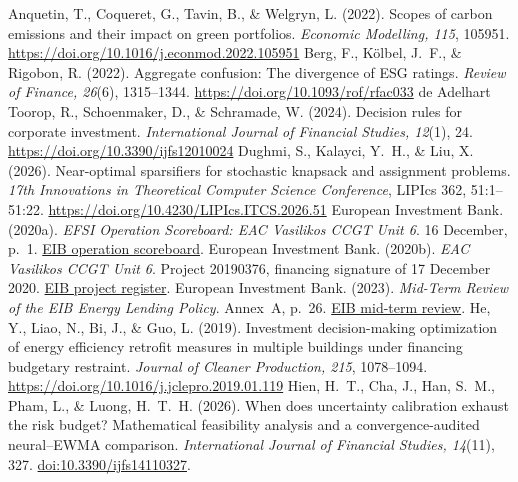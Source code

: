 \begin{thebibliography}{}
\setlength{\itemsep}{5pt plus 1pt}
 Anquetin, T., Coqueret, G., Tavin, B., \& Welgryn, L. (2022). Scopes of carbon emissions and their impact on green portfolios. \emph{Economic Modelling, 115}, 105951. \url{https://doi.org/10.1016/j.econmod.2022.105951}
 Berg, F., Kölbel, J.~F., \& Rigobon, R. (2022). Aggregate confusion: The divergence of ESG ratings. \emph{Review of Finance, 26}(6), 1315--1344. \url{https://doi.org/10.1093/rof/rfac033}
 de Adelhart Toorop, R., Schoenmaker, D., \& Schramade, W. (2024). Decision rules for corporate investment. \emph{International Journal of Financial Studies, 12}(1), 24. \url{https://doi.org/10.3390/ijfs12010024}
 Dughmi, S., Kalayci, Y.~H., \& Liu, X. (2026). Near-optimal sparsifiers for stochastic knapsack and assignment problems. \emph{17th Innovations in Theoretical Computer Science Conference}, LIPIcs 362, 51:1--51:22. \url{https://doi.org/10.4230/LIPIcs.ITCS.2026.51}
 European Investment Bank. (2020a). \emph{EFSI Operation Scoreboard: EAC Vasilikos CCGT Unit 6}. 16 December, p.~1. \href{https://www.eib.org/attachments/registers/137305639.pdf}{EIB operation scoreboard}.
 European Investment Bank. (2020b). \emph{EAC Vasilikos CCGT Unit 6}. Project 20190376, financing signature of 17 December 2020. \href{https://www.eib.org/en/projects/all/20190376}{EIB project register}.
 European Investment Bank. (2023). \emph{Mid-Term Review of the EIB Energy Lending Policy}. Annex~A, p.~26. \href{https://www.eib.org/attachments/lucalli/20230012_mid-term_review_of_the_energy_lending_policy_en.pdf}{EIB mid-term review}.
 He, Y., Liao, N., Bi, J., \& Guo, L. (2019). Investment decision-making optimization of energy efficiency retrofit measures in multiple buildings under financing budgetary restraint. \emph{Journal of Cleaner Production, 215}, 1078--1094. \url{https://doi.org/10.1016/j.jclepro.2019.01.119}
 Hien, H.~T., Cha, J., Han, S.~M., Pham, L., \& Luong, H.~T.~H. (2026). When does uncertainty calibration exhaust the risk budget? Mathematical feasibility analysis and a convergence-audited neural--EWMA comparison. \emph{International Journal of Financial Studies, 14}(11), 327. \href{https://www.mdpi.com/2227-7072/14/11/327}{doi:10.3390/ijfs14110327}.

\end{thebibliography}
